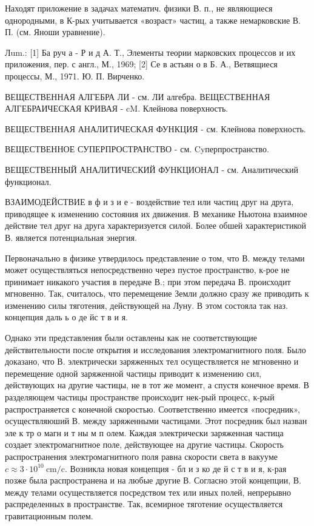 \documentclass[10pt]{article}
\begin{document}
Находят приложение в задачах математич. физики В. п., не являющиеся однородными, в К-рых учитывается «возраст» частиц, а также немарковские В. П. (см. Яноши уравнение).



Лum.: [1] Ба руч а - Р и д А. Т., Элементы теории марковских процессов и их приложения, пер. с англ., М., 1969; [2] Се в астьян о в Б. А., Ветвящиеся процессы, М., 1971. Ю. П. Вирченко.



ВЕЩЕСТВЕННАЯ АЛГЕБРА ЛИ - см. ЛИ алгебра. ВЕЩЕСТВЕННАЯ АЛГЕБРАИЧЕСКАЯ КРИВАЯ - $\mathrm{cM}$. Клейнова поверхность.



ВЕЩЕСТВЕННАЯ АНАЛИТИЧЕСКАЯ ФУНКЦИЯ - см. Клейнова поверхность.



ВЕЩЕСТВЕННОЕ СУПЕРПРОСТРАНСТВО - см. Cyперпространство.



ВЕЩЕСТВЕННЫЙ АНАЛИТИЧЕСКИЙ ФУНКЦИОНАЛ - см. Аналитический функционал.



ВЗАИМОДЕЙСТВИЕ в ф и з и е - воздействие тел или частиц друг на друга, приводящее к изменению состояния их движения. В механике Ньютона взаимное действие тел друг на друга характеризуется силой. Более обшей характеристикой В. является потенциальная энергия.



Первоначально в физике утвердилось представление о том, что В. между телами может осуществляться непосредственно через пустое пространство, к-рое не принимает никакого участия в передаче В.; при этом передача В. происходит мгновенно. Так, считалось, что перемещение Земли должно сразу же приводить к изменению силы тяготения, действующей на Луну. В этом состояла так наз. концепция даль ь о де йс т в и я.



Однако эти представления были оставлены как не соответствующие действительности после открытия и исследования электромагнитного поля. Было доказано, что В. электрически заряженных тел осуществляется не мгновенно и перемещение одной заряженной частицы приводит к изменению сил, действующих на другие частицы, не в тот же момент, а спустя конечное время. В разделяющем частицы пространстве происходит нек-рый процесс, к-рый распространяется с конечной скоростью. Соответственно имеется «посредник», осуществляюший В. между заряженными частицами. Этот посредник был назван эле к тр о магн и т ны м п олем. Каждая электрически заряженная частица создает электромагнитное поле, действующее на другие частицы. Скорость распространения электромагнитного поля равна скорости света в вакууме $c \approx 3 \cdot 10^{10} \mathrm{~cm} / \mathrm{c}$. Возникла новая концепция - бл и з ко де й с т в и я, к-рая позже была распространена и на любые другие В. Согласно этой концепции, В. между телами осуществляется посредством тех или иных полей, непрерывно распределенных в пространстве. Так, всемирное тяготение осуществляется гравитационным полем.
\end{document}
